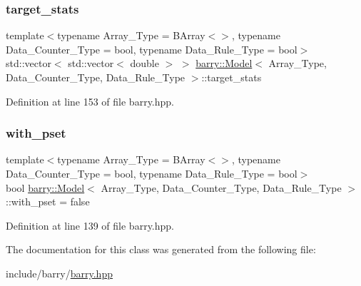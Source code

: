 \subsubsection{\texorpdfstring{target\+\_\+stats}{target\_stats}}
{\footnotesize\ttfamily template$<$typename Array\+\_\+\+Type  = B\+Array$<$$>$, typename Data\+\_\+\+Counter\+\_\+\+Type  = bool, typename Data\+\_\+\+Rule\+\_\+\+Type  = bool$>$ \\
std\+::vector$<$ std\+::vector$<$ double $>$ $>$ \hyperlink{classbarry_1_1_model}{barry\+::\+Model}$<$ Array\+\_\+\+Type, Data\+\_\+\+Counter\+\_\+\+Type, Data\+\_\+\+Rule\+\_\+\+Type $>$\+::target\+\_\+stats}



Definition at line 153 of file barry.\+hpp.

\mbox{\label{classbarry_1_1_model_a08c74ccd0aa76906f724ccb5e36d0762}} 
\subsubsection{\texorpdfstring{with\+\_\+pset}{with\_pset}}
{\footnotesize\ttfamily template$<$typename Array\+\_\+\+Type  = B\+Array$<$$>$, typename Data\+\_\+\+Counter\+\_\+\+Type  = bool, typename Data\+\_\+\+Rule\+\_\+\+Type  = bool$>$ \\
bool \hyperlink{classbarry_1_1_model}{barry\+::\+Model}$<$ Array\+\_\+\+Type, Data\+\_\+\+Counter\+\_\+\+Type, Data\+\_\+\+Rule\+\_\+\+Type $>$\+::with\+\_\+pset = false}



Definition at line 139 of file barry.\+hpp.



The documentation for this class was generated from the following file\+:\begin{DoxyCompactItemize}
\item 
include/barry/\hyperlink{barry_8hpp}{barry.\+hpp}\end{DoxyCompactItemize}
